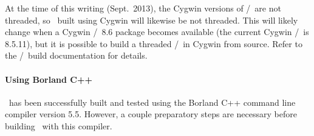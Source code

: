 At the time of this writing (Sept.\ 2013), the Cygwin versions of
\Tcl/\Tk\ are not threaded, so \OOMMF\ built using Cygwin will
likewise be not threaded.  This will likely change when a Cygwin
\Tcl/\Tk\ 8.6 package becomes available (the current Cygwin
\Tcl/\Tk\ is 8.5.11), but it is possible to build a threaded
\Tcl/\Tk\ in Cygwin from source.  Refer to the \Tcl/\Tk\ build
documentation for details.

\paragraph{Using Borland C++}
\OOMMF\ has been successfully built and tested using the
Borland C++ command line compiler version 5.5.
However, a couple preparatory steps are necessary before building
\OOMMF\ with this compiler.
